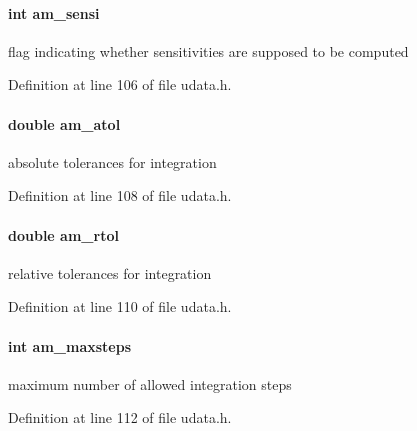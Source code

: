 \paragraph[{am\+\_\+sensi}]{\setlength{\rightskip}{0pt plus 5cm}int am\+\_\+sensi}\label{struct_user_data_a3bd631d595b8a864de83f25a1756ce3d}
flag indicating whether sensitivities are supposed to be computed 

Definition at line 106 of file udata.\+h.

\hypertarget{struct_user_data_a2aade90998d7e2cefa7953d4fdbc438b}{}
\paragraph[{am\+\_\+atol}]{\setlength{\rightskip}{0pt plus 5cm}double am\+\_\+atol}\label{struct_user_data_a2aade90998d7e2cefa7953d4fdbc438b}
absolute tolerances for integration 

Definition at line 108 of file udata.\+h.

\hypertarget{struct_user_data_a2370b78f280747d84a69619ea8c55985}{}
\paragraph[{am\+\_\+rtol}]{\setlength{\rightskip}{0pt plus 5cm}double am\+\_\+rtol}\label{struct_user_data_a2370b78f280747d84a69619ea8c55985}
relative tolerances for integration 

Definition at line 110 of file udata.\+h.

\hypertarget{struct_user_data_a0187950731c16f2857d0cd5b92416352}{}
\paragraph[{am\+\_\+maxsteps}]{\setlength{\rightskip}{0pt plus 5cm}int am\+\_\+maxsteps}\label{struct_user_data_a0187950731c16f2857d0cd5b92416352}
maximum number of allowed integration steps 

Definition at line 112 of file udata.\+h.

\hypertarget{struct_user_data_a1f2514c0ee00da61ade386173b718a02}{}
